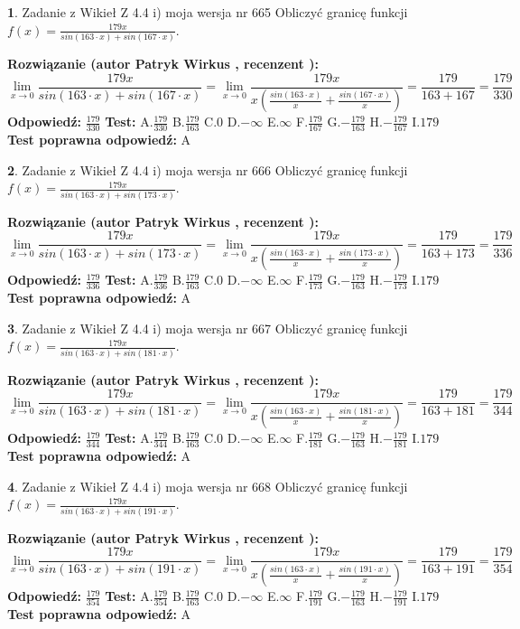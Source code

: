 \documentclass[12pt, a4paper]{article}
\theoremstyle{definition} %
\newtheorem{zad}{}
\newcommand{\zadStart}[1]{\begin{zad}#1\newline}
\newcommand{\zadStop}{\end{zad}}
\newcommand{\rozwStart}[2]{\noindent \textbf{Rozwiązanie (autor #1 , recenzent #2): }\newline}
\newcommand{\rozwStop}{\newline}
\newcommand{\odpStart}{\noindent \textbf{Odpowiedź:}\newline}
\newcommand{\odpStop}{\newline}
\newcommand{\testStart}{\noindent \textbf{Test:}\newline}
\newcommand{\testStop}{\newline}
\newcommand{\kluczStart}{\noindent \textbf{Test poprawna odpowiedź:}\newline}
\newcommand{\kluczStop}{\newline}
\begin{document}
\zadStart{Zadanie z Wikieł Z 4.4 i) moja wersja nr 665}
Obliczyć granicę funkcji $f(x)=\frac{179x}{sin(163\cdot x) +sin(167\cdot x)}$.
\zadStop
\rozwStart{Patryk Wirkus}{}
$$\lim\limits_{x\to 0}\frac{179x}{sin(163\cdot x) +sin(167\cdot x)}=\lim\limits_{x\to 0}\frac{179x}{x(\frac{sin(163\cdot x)}{x}+\frac{sin(167\cdot x)}{x})}=\frac{179}{163+167} = \frac{179}{330}$$
\rozwStop
\odpStart
$\frac{179}{330}$
\odpStop
\testStart
A.$\frac{179}{330}$
B.$\frac{179}{163}$
C.$0$
D.$-\infty$
E.$\infty$
F.$\frac{179}{167}$
G.$-\frac{179}{163}$
H.$-\frac{179}{167}$
I.$179$
\testStop
\kluczStart
A
\kluczStop



\zadStart{Zadanie z Wikieł Z 4.4 i) moja wersja nr 666}
Obliczyć granicę funkcji $f(x)=\frac{179x}{sin(163\cdot x) +sin(173\cdot x)}$.
\zadStop
\rozwStart{Patryk Wirkus}{}
$$\lim\limits_{x\to 0}\frac{179x}{sin(163\cdot x) +sin(173\cdot x)}=\lim\limits_{x\to 0}\frac{179x}{x(\frac{sin(163\cdot x)}{x}+\frac{sin(173\cdot x)}{x})}=\frac{179}{163+173} = \frac{179}{336}$$
\rozwStop
\odpStart
$\frac{179}{336}$
\odpStop
\testStart
A.$\frac{179}{336}$
B.$\frac{179}{163}$
C.$0$
D.$-\infty$
E.$\infty$
F.$\frac{179}{173}$
G.$-\frac{179}{163}$
H.$-\frac{179}{173}$
I.$179$
\testStop
\kluczStart
A
\kluczStop



\zadStart{Zadanie z Wikieł Z 4.4 i) moja wersja nr 667}
Obliczyć granicę funkcji $f(x)=\frac{179x}{sin(163\cdot x) +sin(181\cdot x)}$.
\zadStop
\rozwStart{Patryk Wirkus}{}
$$\lim\limits_{x\to 0}\frac{179x}{sin(163\cdot x) +sin(181\cdot x)}=\lim\limits_{x\to 0}\frac{179x}{x(\frac{sin(163\cdot x)}{x}+\frac{sin(181\cdot x)}{x})}=\frac{179}{163+181} = \frac{179}{344}$$
\rozwStop
\odpStart
$\frac{179}{344}$
\odpStop
\testStart
A.$\frac{179}{344}$
B.$\frac{179}{163}$
C.$0$
D.$-\infty$
E.$\infty$
F.$\frac{179}{181}$
G.$-\frac{179}{163}$
H.$-\frac{179}{181}$
I.$179$
\testStop
\kluczStart
A
\kluczStop



\zadStart{Zadanie z Wikieł Z 4.4 i) moja wersja nr 668}
Obliczyć granicę funkcji $f(x)=\frac{179x}{sin(163\cdot x) +sin(191\cdot x)}$.
\zadStop
\rozwStart{Patryk Wirkus}{}
$$\lim\limits_{x\to 0}\frac{179x}{sin(163\cdot x) +sin(191\cdot x)}=\lim\limits_{x\to 0}\frac{179x}{x(\frac{sin(163\cdot x)}{x}+\frac{sin(191\cdot x)}{x})}=\frac{179}{163+191} = \frac{179}{354}$$
\rozwStop
\odpStart
$\frac{179}{354}$
\odpStop
\testStart
A.$\frac{179}{354}$
B.$\frac{179}{163}$
C.$0$
D.$-\infty$
E.$\infty$
F.$\frac{179}{191}$
G.$-\frac{179}{163}$
H.$-\frac{179}{191}$
I.$179$
\testStop
\kluczStart
A
\kluczStop
\end{document}

